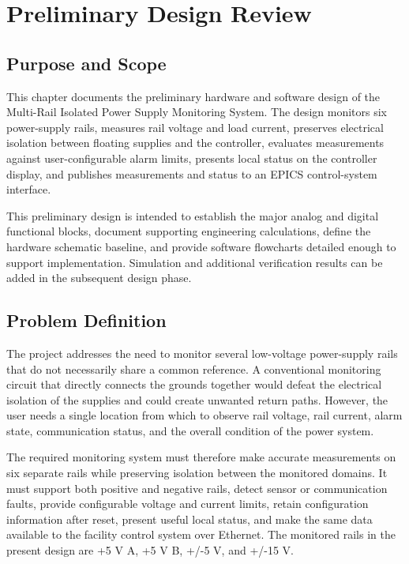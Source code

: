 \chapter{Preliminary Design Review}
\label{chap:preliminary-design}

\section{Purpose and Scope}
This chapter documents the preliminary hardware and software design of the
Multi-Rail Isolated Power Supply Monitoring System. The design monitors six
power-supply rails, measures rail voltage and load current, preserves electrical
isolation between floating supplies and the controller, evaluates measurements
against user-configurable alarm limits, presents local status on the controller
display, and publishes measurements and status to an EPICS control-system
interface.

This preliminary design is intended to establish the major analog and digital
functional blocks, document supporting engineering calculations, define the
hardware schematic baseline, and provide software flowcharts detailed enough to
support implementation. Simulation and additional verification results can be
added in the subsequent design phase.

\section{Problem Definition}
The project addresses the need to monitor several low-voltage power-supply rails
that do not necessarily share a common reference. A conventional
monitoring circuit that directly connects the grounds together
would defeat the electrical isolation of the supplies and could create unwanted
return paths. However, the user needs a single location from which to observe rail voltage, rail current, alarm state, communication status, and the overall condition of the power system.

The required monitoring system must therefore make accurate measurements on
six separate rails while preserving isolation between the monitored domains. It
must support both positive and negative rails, detect sensor or communication
faults, provide configurable voltage and current limits, retain configuration
information after reset, present useful local status, and make the same data
available to the facility control system over Ethernet. The monitored rails in
the present design are +5 V A, +5 V B, +/-5 V, and +/-15 V.

